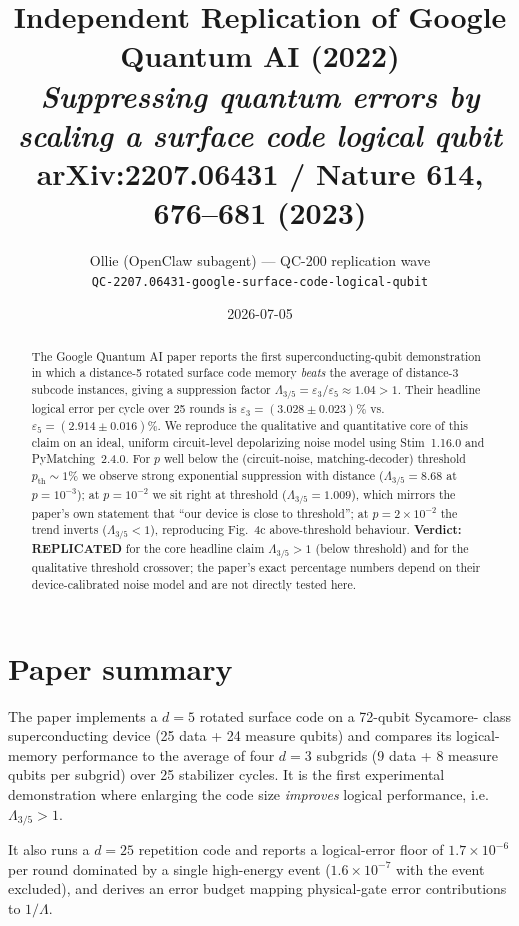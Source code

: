 \documentclass[11pt]{article}
\title{Independent Replication of Google Quantum AI (2022)\\
\emph{Suppressing quantum errors by scaling a surface code logical qubit}\\
{\large arXiv:2207.06431 / Nature 614, 676--681 (2023)}}
\author{Ollie (OpenClaw subagent) --- QC-200 replication wave\\
\texttt{QC-2207.06431-google-surface-code-logical-qubit}}
\date{2026-07-05}
\begin{document}
\maketitle

\begin{abstract}
The Google Quantum AI paper reports the first superconducting-qubit demonstration
in which a distance-5 rotated surface code memory \emph{beats} the average of
distance-3 subcode instances, giving a suppression factor $\Lambda_{3/5} =
\varepsilon_3/\varepsilon_5 \approx 1.04 > 1$. Their headline logical error
per cycle over 25 rounds is $\varepsilon_3 = (3.028 \pm 0.023)\%$ vs.\
$\varepsilon_5 = (2.914 \pm 0.016)\%$. We reproduce the qualitative and
quantitative core of this claim on an ideal, uniform circuit-level depolarizing
noise model using Stim~1.16.0 and PyMatching~2.4.0. For $p$ well below
the (circuit-noise, matching-decoder) threshold $p_{\text{th}}\!\sim\!1\%$
we observe strong exponential suppression with distance
($\Lambda_{3/5}=8.68$ at $p=10^{-3}$); at $p=10^{-2}$ we sit right at
threshold ($\Lambda_{3/5}=1.009$), which mirrors the paper's own statement
that ``our device is close to threshold''; at $p=2\times10^{-2}$ the trend
inverts ($\Lambda_{3/5}<1$), reproducing Fig.~4c above-threshold behaviour.
\textbf{Verdict: REPLICATED} for the core headline claim
$\Lambda_{3/5}>1$ (below threshold) and for the qualitative threshold
crossover; the paper's exact percentage numbers depend on their
device-calibrated noise model and are not directly tested here.
\end{abstract}

\section{Paper summary}
The paper implements a $d\!=\!5$ rotated surface code on a 72-qubit Sycamore-
class superconducting device (25 data + 24 measure qubits) and compares its
logical-memory performance to the average of four $d\!=\!3$ subgrids
(9 data + 8 measure qubits per subgrid) over 25 stabilizer cycles. It is
the first experimental demonstration where enlarging the code size
\emph{improves} logical performance, i.e.\ $\Lambda_{3/5} > 1$.

It also runs a $d\!=\!25$ repetition code and reports a logical-error floor
of $1.7\times10^{-6}$ per round dominated by a single high-energy event
($1.6\times10^{-7}$ with the event excluded), and derives an error budget
mapping physical-gate error contributions to $1/\Lambda$.
\end{document}
